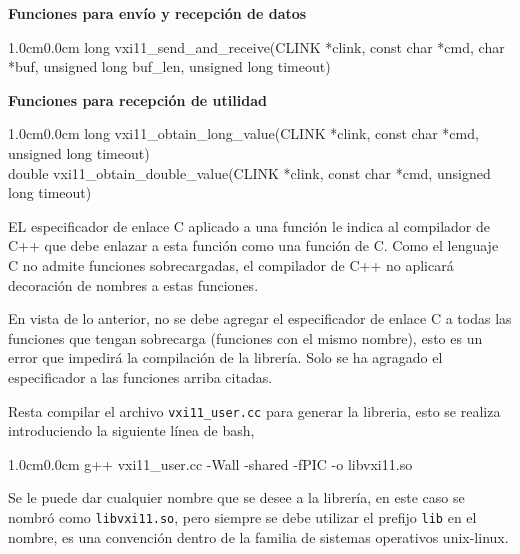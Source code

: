 \documentclass[paper=letter,oneside,fontsize=11pt, parskip=full]{scrartcl}
\newenvironment{code}
	{\begin{adjustwidth}{1.0cm}{0.0cm}\ttfamily}
	{\end{adjustwidth}}
\begin{document}
	\textbf{Funciones para envío y recepción de datos}
	\begin{code}
		long vxi11\_send\_and\_receive(CLINK *clink, const char *cmd, char *buf, unsigned long buf\_len, unsigned long timeout) 
	\end{code}	
		
	\textbf{Funciones para recepción de utilidad}
	\begin{code}
		long vxi11\_obtain\_long\_value(CLINK *clink, const char *cmd, unsigned long timeout) \\
		double vxi11\_obtain\_double\_value(CLINK *clink, const char *cmd, unsigned long timeout)
	\end{code}

	EL especificador de enlace C aplicado a una función le indica al compilador de C++ que debe enlazar a esta función como una función de C. Como el lenguaje C no admite funciones sobrecargadas, el compilador de C++ no aplicará decoración de nombres a estas funciones. 
	
	En vista de lo anterior, no se debe agregar el especificador de enlace C a todas las funciones que tengan sobrecarga (funciones con el mismo nombre), esto es un error que impedirá la compilación de la librería. Solo se ha agragado el especificador a las funciones arriba citadas.
	
	Resta compilar el archivo \texttt{vxi11\_user.cc} para generar la libreria, esto se realiza introduciendo la siguiente línea de bash,

	\begin{code}
		g++ vxi11\_user.cc -Wall -shared -fPIC -o libvxi11.so
	\end{code}
	
	Se le puede dar cualquier nombre que se desee a la librería, en este caso se nombró como \texttt{libvxi11.so}, pero siempre se debe utilizar el prefijo \texttt{lib} en el nombre, es una convención dentro de la familia de sistemas operativos unix-linux.		
	
\end{document}
